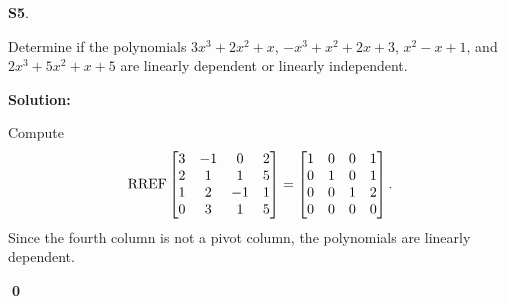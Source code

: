 \documentclass{article}
\newenvironment{problem}[1]
{
	\begin{flushleft}
	\textbf{#1}.
	\ignorespaces
}
{
	\end{flushleft}
}
\newenvironment{solution}
{
	\ignorespaces
	\textbf{Solution:}
}
{
	\ignorespacesafterend
	\begin{flushright}
	{\bfseries \qed}
	\end{flushright}
}
\begin{document}
\begin{problem}{S5}
Determine if the polynomials \(3x^3+2x^2+x\), \(-x^3+x^2+2x+3\), \(x^2-x+1\), and \(2x^3+5x^2+x+5\)
are linearly dependent or linearly independent.
\end{problem}
\begin{solution}
Compute 
\[\operatorname{RREF} \begin{bmatrix} 3 & -1 & 0 & 2 \\ 2 & 1 & 1 & 5 \\ 1 & 2 & -1 & 1 \\ 0 & 3 & 1 & 5 \end{bmatrix} = 
\begin{bmatrix} 1 & 0 & 0 & 1 \\ 0 & 1 & 0 & 1 \\ 0 & 0 & 1 & 2 \\ 0 & 0 & 0 & 0 \end{bmatrix}.\]
Since the fourth column is not a pivot column, the polynomials are linearly dependent.
\end{solution}
\end{document}

